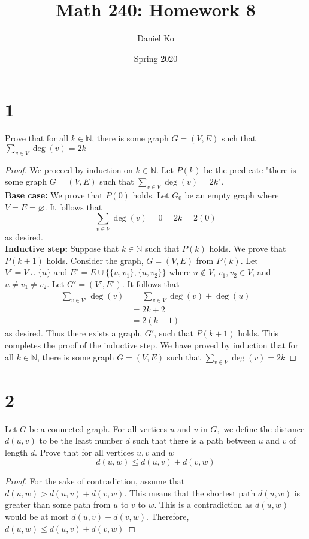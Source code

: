 \documentclass[11pt]{scrartcl}
\title{Math 240: Homework 8}
\author{Daniel Ko}
\date{Spring 2020}
\begin{document}
\maketitle

\section{1}
Prove that for all $k \in \mathbb{N}$, there is some graph $G=(V, E)$ such that $\sum_{v \in V} \operatorname{deg}(v)=2k$
\begin{proof}
	We proceed by induction on $k\in \mathbb{N}$. Let $P(k)$ be the predicate
	"there is some graph $G=(V, E)$ such that $\sum_{v \in V} \operatorname{deg}(v)=2k$".\\
	\textbf{Base case:} We prove that $P(0)$ holds. Let $G_0$ be an empty graph where $V = E = \varnothing$.
	It follows that $$ \sum_{v \in V} \operatorname{deg}(v) = 0 = 2k = 2(0)$$
	as desired.\\
	\textbf{Inductive step:} Suppose that $k\in \mathbb{N}$ such that $P(k)$ holds. We prove that $P(k + 1)$ holds.
	Consider the graph, $G = (V,E)$ from $P(k)$. Let $V' = V \cup \{u\}$ and $E' =E \cup \{\{u,v_1\},\{u,v_2\}\}$
	where $u \notin V$, $v_1,v_2 \in V$, and $u \neq v_1 \neq v_2$. Let $G' = (V',E')$. It follows that
	\begin{align*}
		\sum_{v \in V'} \operatorname{deg}(v) & = \sum_{v \in V} \operatorname{deg}(v) + \operatorname{deg}(u) \\
		                                      & = 2k + 2                                                       \\
		                                      & = 2(k + 1)
	\end{align*}
	as desired. Thus there exists a graph, $G'$, such that $P(k+1)$ holds.
	This completes the proof of the inductive step.
	We have proved by induction that for all $k \in \mathbb{N}$,
	there is some graph $G=(V, E)$ such that $\sum_{v \in V} \operatorname{deg}(v)=2k$
\end{proof}

\section{2}
Let $G$ be a connected graph. For all vertices $u$ and $v$ in $G,$ we define the distance $d(u, v)$
to be the least number $d$ such that there is a path between $u$ and $v$ of length $d .$ Prove that for all vertices $u, v$ and $w$
$$ d(u, w) \leq d(u, v)+d(v, w) $$
\begin{proof}
	For the sake of contradiction, assume that $d(u, w) > d(u, v) +d(v, w)$.
	This means that the shortest path $d(u, w)$ is greater than some path from $u$ to $v$ to $w$.
	This is a contradiction as $d(u,w)$ would be at most $d(u, v) +d(v, w)$.
	Therefore, $ d(u, w) \leq d(u, v)+d(v, w) $
\end{proof}
\end{document}

